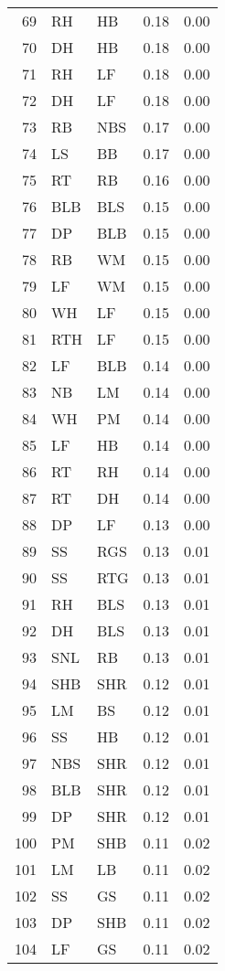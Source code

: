 \begin{table}[ht]
\begin{tabular}{rllrr}
  69 & RH & HB & 0.18 & 0.00 \\ 
  70 & DH & HB & 0.18 & 0.00 \\ 
  71 & RH & LF & 0.18 & 0.00 \\ 
  72 & DH & LF & 0.18 & 0.00 \\ 
  73 & RB & NBS & 0.17 & 0.00 \\ 
  74 & LS & BB & 0.17 & 0.00 \\ 
  75 & RT & RB & 0.16 & 0.00 \\ 
  76 & BLB & BLS & 0.15 & 0.00 \\ 
  77 & DP & BLB & 0.15 & 0.00 \\ 
  78 & RB & WM & 0.15 & 0.00 \\ 
  79 & LF & WM & 0.15 & 0.00 \\ 
  80 & WH & LF & 0.15 & 0.00 \\ 
  81 & RTH & LF & 0.15 & 0.00 \\ 
  82 & LF & BLB & 0.14 & 0.00 \\ 
  83 & NB & LM & 0.14 & 0.00 \\ 
  84 & WH & PM & 0.14 & 0.00 \\ 
  85 & LF & HB & 0.14 & 0.00 \\ 
  86 & RT & RH & 0.14 & 0.00 \\ 
  87 & RT & DH & 0.14 & 0.00 \\ 
  88 & DP & LF & 0.13 & 0.00 \\ 
  89 & SS & RGS & 0.13 & 0.01 \\ 
  90 & SS & RTG & 0.13 & 0.01 \\ 
  91 & RH & BLS & 0.13 & 0.01 \\ 
  92 & DH & BLS & 0.13 & 0.01 \\ 
  93 & SNL & RB & 0.13 & 0.01 \\ 
  94 & SHB & SHR & 0.12 & 0.01 \\ 
  95 & LM & BS & 0.12 & 0.01 \\ 
  96 & SS & HB & 0.12 & 0.01 \\ 
  97 & NBS & SHR & 0.12 & 0.01 \\ 
  98 & BLB & SHR & 0.12 & 0.01 \\ 
  99 & DP & SHR & 0.12 & 0.01 \\ 
  100 & PM & SHB & 0.11 & 0.02 \\ 
  101 & LM & LB & 0.11 & 0.02 \\ 
  102 & SS & GS & 0.11 & 0.02 \\ 
  103 & DP & SHB & 0.11 & 0.02 \\ 
  104 & LF & GS & 0.11 & 0.02 \\ 

\end{tabular}
\end{table}
